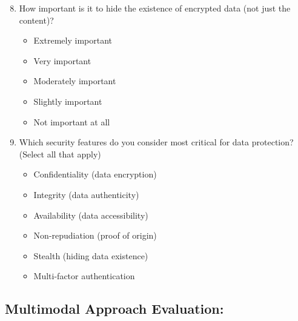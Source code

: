 \documentclass[12pt, a4paper, oneside]{book}
\begin{document}
\begin{enumerate}\setcounter{enumi}{7}
    \item How important is it to hide the existence of encrypted data (not just the content)?
    \begin{itemize}
        \item Extremely important
        \item Very important
        \item Moderately important
        \item Slightly important
        \item Not important at all
    \end{itemize}

    \item Which security features do you consider most critical for data protection? (Select all that apply)
    \begin{itemize}
        \item Confidentiality (data encryption)
        \item Integrity (data authenticity)
        \item Availability (data accessibility)
        \item Non-repudiation (proof of origin)
        \item Stealth (hiding data existence)
        \item Multi-factor authentication
    \end{itemize}
\end{enumerate}

\subsection*{Multimodal Approach Evaluation:}
\end{document}
